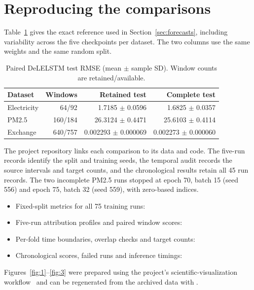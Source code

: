 \documentclass[10pt,a4paper]{article}
\begin{document}
\clearpage
\section{Reproducing the comparisons}\label{app:records}
Table~\ref{tab:paired} gives the exact reference used in Section~\ref{sec:forecasts}, including variability across the five checkpoints per dataset. The two columns use the same weights and the same random split.

\begin{table}[H]
\centering
\caption{Paired DeLELSTM test RMSE (mean \(\pm\) sample SD). Window counts are retained/available.}\label{tab:paired}
\small
\begin{tabular}{@{}lrrr@{}}
\toprule
\textbf{Dataset} & \textbf{Windows} & \textbf{Retained test} & \textbf{Complete test} \\
\midrule
Electricity & 64/92 & 1.7185 \(\pm\) 0.0596 & 1.6825 \(\pm\) 0.0357 \\
PM2.5 & 160/184 & 26.3124 \(\pm\) 0.4471 & 25.6103 \(\pm\) 0.4114 \\
Exchange & 640/757 & 0.002293 \(\pm\) 0.000069 & 0.002273 \(\pm\) 0.000060 \\
\bottomrule
\end{tabular}
\end{table}

The project repository links each comparison to its data and code. The five-run records identify the split and training seeds, the temporal audit records the source intervals and target counts, and the chronological results retain all 45 run records. The two incomplete PM2.5 runs stopped at epoch 70, batch 15 (seed 556) and epoch 75, batch 32 (seed 559), with zero-based indices.

\begin{itemize}
  \item Fixed-split metrics for all 75 training runs: 
  \item Five-run attribution profiles and paired window scores: 
  \item Per-fold time boundaries, overlap checks and target counts: 
  \item Chronological scores, failed runs and inference timings: 
\end{itemize}
Figures~\ref{fig:1}--\ref{fig:3} were prepared using the project's scientific-visualization workflow~\cite{kassis} and can be regenerated from the archived data with .
\end{document}
